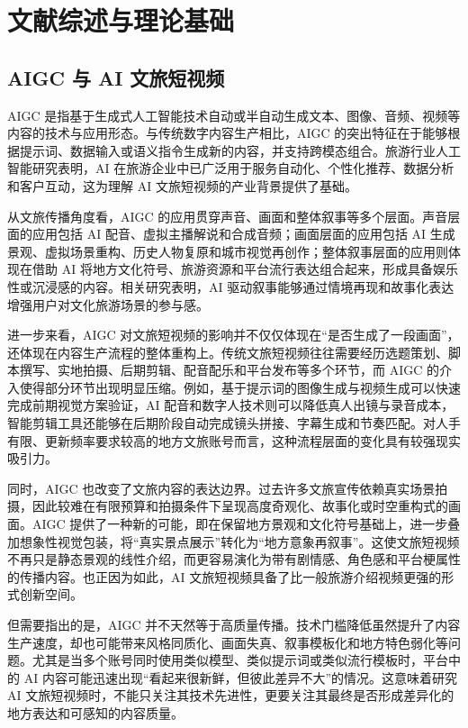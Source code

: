 \chapter{文献综述与理论基础}

\section{AIGC 与 AI 文旅短视频}

AIGC 是指基于生成式人工智能技术自动或半自动生成文本、图像、音频、视频等内容的技术与应用形态。与传统数字内容生产相比，AIGC 的突出特征在于能够根据提示词、数据输入或语义指令生成新的内容，并支持跨模态组合\cite{lit01}。旅游行业人工智能研究表明，AI 在旅游企业中已广泛用于服务自动化、个性化推荐、数据分析和客户互动，这为理解 AI 文旅短视频的产业背景提供了基础\cite{lit24}。

从文旅传播角度看，AIGC 的应用贯穿声音、画面和整体叙事等多个层面。声音层面的应用包括 AI 配音、虚拟主播解说和合成音频；画面层面的应用包括 AI 生成景观、虚拟场景重构、历史人物复原和城市视觉再创作；整体叙事层面的应用则体现在借助 AI 将地方文化符号、旅游资源和平台流行表达组合起来，形成具备娱乐性或沉浸感的内容。相关研究表明，AI 驱动叙事能够通过情境再现和故事化表达增强用户对文化旅游场景的参与感\cite{lit19}。

进一步来看，AIGC 对文旅短视频的影响并不仅仅体现在“是否生成了一段画面”，还体现在内容生产流程的整体重构上。传统文旅短视频往往需要经历选题策划、脚本撰写、实地拍摄、后期剪辑、配音配乐和平台发布等多个环节，而 AIGC 的介入使得部分环节出现明显压缩。例如，基于提示词的图像生成与视频生成可以快速完成前期视觉方案验证，AI 配音和数字人技术则可以降低真人出镜与录音成本，智能剪辑工具还能够在后期阶段自动完成镜头拼接、字幕生成和节奏匹配。对人手有限、更新频率要求较高的地方文旅账号而言，这种流程层面的变化具有较强现实吸引力。

同时，AIGC 也改变了文旅内容的表达边界。过去许多文旅宣传依赖真实场景拍摄，因此较难在有限预算和拍摄条件下呈现高度奇观化、故事化或时空重构式的画面。AIGC 提供了一种新的可能，即在保留地方景观和文化符号基础上，进一步叠加想象性视觉包装，将“真实景点展示”转化为“地方意象再叙事”。这使文旅短视频不再只是静态景观的线性介绍，而更容易演化为带有剧情感、角色感和平台梗属性的传播内容。也正因为如此，AI 文旅短视频具备了比一般旅游介绍视频更强的形式创新空间。

但需要指出的是，AIGC 并不天然等于高质量传播。技术门槛降低虽然提升了内容生产速度，却也可能带来风格同质化、画面失真、叙事模板化和地方特色弱化等问题。尤其是当多个账号同时使用类似模型、类似提示词或类似流行模板时，平台中的 AI 内容可能迅速出现“看起来很新鲜，但彼此差异不大”的情况。这意味着研究 AI 文旅短视频时，不能只关注其技术先进性，更要关注其最终是否形成差异化的地方表达和可感知的内容质量。

